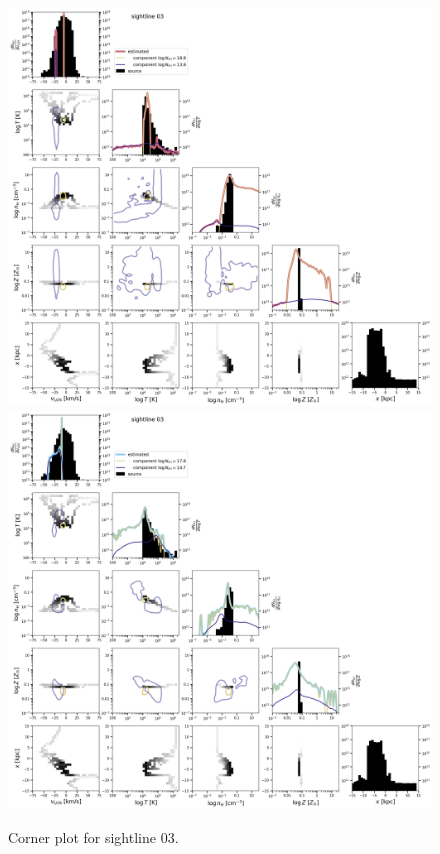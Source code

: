 \documentclass[fleqn,usenatbib]{mnras}
\begin{document}
\begin{figure}
    \centering
    \includegraphics[height=0.45\textheight]{figures/sample2/original/sightline_0003.png}
    \includegraphics[height=0.45\textheight]{figures/sample2/high-z/sightline_0003.png}
    \caption{Corner plot for sightline 03.}
    \label{f: sample2 corner 03}
\end{figure}
\end{document}
